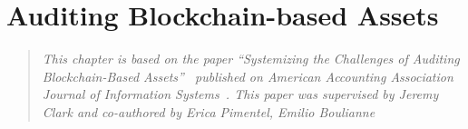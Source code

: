 \chapter{Auditing Blockchain-based Assets}


\begin{quote}
	\textit{This chapter is based on the paper ``Systemizing the Challenges of Auditing Blockchain-Based Assets''~\cite{pimentel2021systemizing} published on American Accounting Association Journal of Information Systems~\cite{pimentel2021systemizing}. This paper was supervised by Jeremy Clark and co-authored by Erica Pimentel, Emilio Boulianne}
\end{quote}

